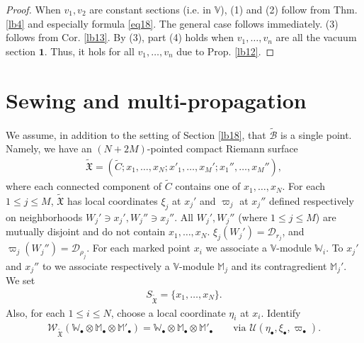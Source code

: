 \documentclass[12pt,a4paper,notitlepage]{article}
\theoremstyle{definition}
\theoremstyle{plain}
\newcommand{\fk}{\mathfrak}
\newcommand{\mc}{\mathcal}
\newcommand{\wtd}{\widetilde}
\newcommand{\id}{\mathbf{1}}
\newcommand{\scr}{\mathscr}
\newcommand{\blt}{\bullet}
\newcommand{\Vbb}{\mathbb V}
\newcommand{\Wbb}{\mathbb W}
\newcommand{\Mbb}{\mathbb M}
\newcommand{\Cbb}{\mathbb C}
\numberwithin{equation}{section}
\begin{document}

\begin{proof}
When $v_1,v_2$ are constant sections (i.e. in $\Vbb$), (1) and (2) follow from Thm. \ref{lb4} and especially formula \eqref{eq18}. The general case follows immediately. (3) follows from Cor. \ref{lb13}. By  (3), part (4) holds when $v_1,\dots,v_n$ are all the vacuum section $\id$. Thus, it hols for all $v_1,\dots,v_n$ due to Prop. \ref{lb12}.
\end{proof}





\section{Sewing and multi-propagation}

We assume, in addition to the setting of Section \ref{lb18}, that $\wtd{\mc B}$ is a single point. Namely, we have an $(N+2M)$-pointed compact Riemann surface
\begin{align*}
\wtd{\fk X}=(\wtd C;x_1,\dots,x_N;x'_1,\dots,x_M';x_1'',\dots,x_M''),	
\end{align*}
where each connected component of $\wtd C$ contains one of $x_1,\dots,x_N$. For each $1\leq j\leq M$, $\wtd {\fk X}$ has  local coordinates $\xi_j$ at $x_j'$ and $\varpi_j$ at $x_j''$ defined respectively on neighborhoods $W_j'\ni x_j',W_j''\ni x_j''$. All $W_j',W_j''$ (where $1\leq j\leq M$) are mutually disjoint and do not contain $x_1,\dots,x_N$. $\xi_j(W_j')=\mc D_{r_j}$, and $\varpi_j(W_j'')=\mc D_{\rho_j}$. For each marked point $x_i$ we associate a $\Vbb$-module $\Wbb_i$. To $x_j'$ and $x_j''$ to we associate respectively a $\Vbb$-module $\Mbb_j$ and its contragredient $\Mbb_j'$. We set
\begin{align*}
S_{\wtd{\fk X}}=\{x_1,\dots,x_N\}.	
\end{align*}
Also, for each $1\leq i\leq N$, choose a local coordinate $\eta_i$ at $x_i$. Identify
\begin{align*}
\scr W_{\wtd{\fk X}}(\Wbb_\blt\otimes\Mbb_\blt\otimes\Mbb'_\blt)=\Wbb_\blt\otimes\Mbb_\blt\otimes\Mbb'_\blt	\qquad\text{via }\mc U(\eta_\blt,\xi_\blt,\varpi_\blt).
\end{align*}
\end{document}
